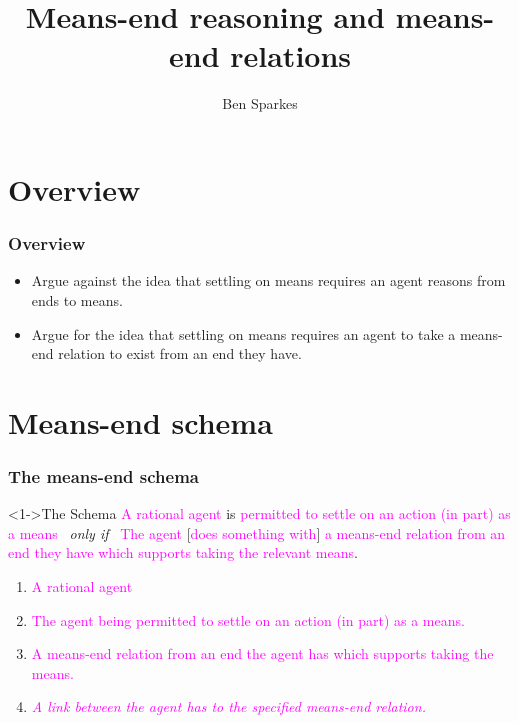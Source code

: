\documentclass[noamssymb,
graphics,
]{beamer} %
\title{Means-end reasoning and means-end relations}
\author{Ben Sparkes}
\begin{document}
\begin{frame}[noframenumbering]
  \titlepage
\end{frame}


\section*{Overview}
\label{sec:overview}

\begin{frame}
  \frametitle{Overview}

  \begin{itemize}
  \item Argue against the idea that settling on means requires an agent reasons from ends to means.
  \item Argue for the idea that settling on means requires an agent to take a means-end relation to exist from an end they have.
  \end{itemize}
\end{frame}


\section{Means-end schema}
\label{sec:schema}

\begin{frame}
  \frametitle{The means-end schema}

  \begin{block}<1->{The Schema}
    \textcolor<3>{fuchsia}{A rational agent} is \textcolor<4>{fuchsia}{permitted to settle on an action (in part) as a means}
    \newline
    \mbox{ }\hfill\emph{only if}\hfill\mbox{ }
    \newline
    \textcolor<3>{fuchsia}{The agent} [\textcolor<6>{fuchsia}{does something with}] \textcolor<5>{fuchsia}{a means-end relation from an end they have which supports taking the relevant means}.
  \end{block}

  \begin{enumerate}%
  \item<3-> \textcolor<3>{fuchsia}{A rational agent}
  \item<4-> \textcolor<4>{fuchsia}{The agent being permitted to settle on an action (in part) as a means.}
  \item<5-> \textcolor<5>{fuchsia}{A means-end relation from an end the agent has which supports taking the means.}
  \item<6-> \textcolor<6->{fuchsia}{\emph<7>{A link between the agent has to the specified means-end relation.}}
  \end{enumerate}
\end{frame}
\end{document}
